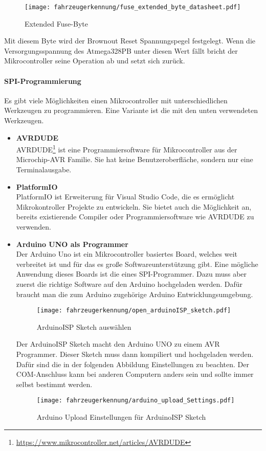 \begin{figure}[H]
    \centering
    \texttt{[image: fahrzeugerkennung/fuse\_extended\_byte\_datasheet.pdf]}
    \caption{Extended Fuse-Byte}
\end{figure}

Mit diesem Byte wird der Brownout Reset Spannungspegel festgelegt. Wenn die Versorgungsspannung des Atmega328PB unter diesen Wert fällt bricht der Mikrocontroller seine Operation ab und setzt sich zurück.


\paragraph{SPI-Programmierung}\mbox{} 

Es gibt viele Möglichkeiten einen Mikrocontroller mit unterschiedlichen Werkzeugen zu programmieren. Eine Variante ist die mit den unten verwendeten Werkzeugen.

\begin{itemize}
    \item \textbf{AVRDUDE} \\
    AVRDUDE\footnote{\url{https://www.mikrocontroller.net/articles/AVRDUDE}} ist eine Programmiersoftware für Mikrocontroller aus der Microchip-AVR Familie. Sie hat keine Benutzeroberfläche, sondern nur eine Terminalausgabe.
    \item \textbf{PlatformIO} \\
    PlatformIO ist Erweiterung für Visual Studio Code, die es ermöglicht Mikrokontroller Projekte zu entwickeln. Sie bietet auch die Möglichkeit an, bereits existierende Compiler oder Programmiersoftware wie AVRDUDE zu verwenden.
    \item \textbf{Arduino UNO als Programmer} \\
    Der Arduino Uno ist ein Mikrocontroller basiertes Board, welches weit verbreitet ist und für das es große Softwareunterstützung gibt. Eine mögliche Anwendung dieses Boards ist die eines SPI-Programmer. 
    Dazu muss aber zuerst die richtige Software auf den Arduino hochgeladen werden. Dafür braucht man die zum Arduino zugehörige Arduino Entwicklungsumgebung.
    \begin{figure}[H]
        \centering
        \texttt{[image: fahrzeugerkennung/open\_arduinoISP\_sketch.pdf]}
        \caption{ArduinoISP Sketch auswählen}
    \end{figure}
    Der ArduinoISP Sketch macht den Arduino UNO zu einem AVR Programmer. Dieser Sketch muss dann kompiliert und hochgeladen werden. Dafür sind die in der folgenden Abbildung Einstellungen zu beachten. Der COM-Anschluss kann
    bei anderen Computern anders sein und sollte immer selbst bestimmt werden. 
    \begin{figure}[H]
        \centering
        \texttt{[image: fahrzeugerkennung/arduino\_upload\_Settings.pdf]}
        \caption{Arduino Upload Einstellungen für ArduinoISP Sketch}
    \end{figure}
\end{itemize}

